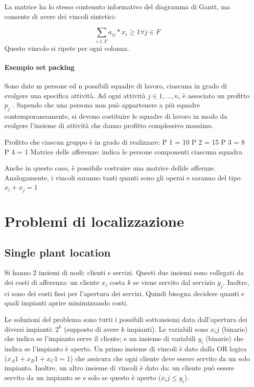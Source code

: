 \documentclass{article}
\begin{document}
La matrice ha lo stesso contenuto informativo del diagramma di Gantt, ma consente 
di avere dei vincoli sintetici:

\begin{equation*}
  \sum_{i\in F} a_{ij}*x_i \geq 1 \forall j \in F
\end{equation*}
Questo vincolo si ripete per ogni colonna.

\paragraph{Esempio set packing}
Sono date m persone ed n possibili squadre di lavoro, ciascuna in grado di svolgere
una specifica attività.
Ad ogni attività $j \in {1,...,n}$, è associato un profitto $p_j$ .
Sapendo che una persona non può appartenere a più squadre contemporaneamente,
si devono costituire le squadre di lavoro in modo da svolgere l’insieme di attività che
danno profitto complessivo massimo.

Profitto che ciascun gruppo è in grado di realizzare:
P 1 = 10
 P 2 = 15
 P 3 = 8
 P 4 = 1 
Matrice delle afferenze: indica le persone componenti ciascuna squadra

Anche in questo caso, è possibile costruire una matrice dellde affernze.
Analogamente, i vincoli saranno tanti quanti sono gli operai e saranno del tipo
$x_i + x_j = 1$


\section{Problemi di localizzazione}

\subsection{Single plant location}
Si hanno 2 insiemi di nodi: clienti e servizi. Questi due insiemi sono collegati 
da dei costi di afferenza: un cliente $x_i$ costa $k$ se viene servito dal servizio 
$y_j$. Inoltre, ci sono dei costi fissi per l'apertura dei servizi. Quindi 
bisogna decidere quanti e quali impianti aprire minimizzando costi.

Le soluzioni del problema sono tutti i possibili sottonsiemi data dall'apertura
dei diversi impianti: $2^k$ (supposto di avere $k$ impianti).
Le variabili sono $x_ij$ (binarie) che indica se l'impianto serve il cliente; 
e un insieme di variabili $y_i$ (binarie) che indica se l'impianto è aperto.
Un primo insieme di vincoli è dato dalla OR logica ($x_A1 + x_B1 + x_C1 = 1$) 
che assicura che ogni cliente 
deve essere servito da un solo impianto. Inoltre, un altro insieme di vincoli è 
dato da: un cliente può essere servito da un impianto se e solo se questo è aperto 
($x_ij\leq y_i$).
\end{document}
